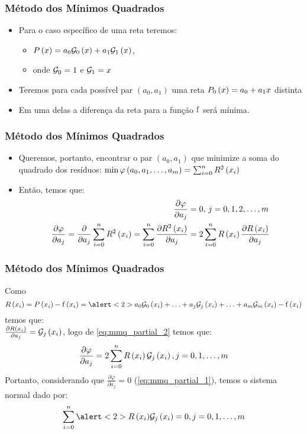 \begin{frame}
\frametitle{Método dos Mínimos Quadrados}

\begin{itemize}
  \item Para o caso específico de uma reta teremos:
    \begin{itemize}
      \item $P\left(x\right) = a_0 \mathcal{G}_0 \left(x\right) + a_1 \mathcal{G}_1 \left(x\right)$,
      \item onde $\mathcal{G}_0 = 1$ e $\mathcal{G}_1 = x$
    \end{itemize}
  \item Teremos para cada possível par $\left(a_0, a_1\right)$ uma reta $P_0 \left(x\right) = a_0 + a_1 x$ distinta
  \item Em uma delas a diferença da reta para a função $\mathrm{f}$ será mínima.
\end{itemize}
\end{frame}

\begin{frame}
\frametitle{Método dos Mínimos Quadrados}

\begin{itemize}
  \item Queremos, portanto, encontrar o par $\left(a_0, a_1\right)$ que minimize a soma do quadrado dos resíduos: $\min \varphi\left(a_0,a_1,\ldots,a_m\right) = \sum_{i=0}^{n}R^2\left(x_i\right)$
  \item Então, temos que:
\begin{align}
\frac{\partial \varphi}{\partial a_j} &= 0,\, j = 0,1,2,\ldots,m\label{eq:mmq_partial_1}\\
%
\frac{\partial \varphi}{\partial a_j} = %
\frac{\partial}{\partial a_j} \sum_{i=0}^{n} R^2 \left(\x_i\right) = %
\sum_{i=0}^{n} \frac{\partial R^2 \left(\x_i\right)}{\partial a_j} &= %
2 \sum_{i=0}^{n} R\left(\x_i\right) \frac{\partial R \left(\x_i\right)}{\partial a_j}\label{eq:mmq_partial_2}
\end{align}
%
\end{itemize}
\end{frame}

\begin{frame}
\frametitle{Método dos Mínimos Quadrados}

Como
{
\footnotesize
\begin{equation}
\label{eq:mmq_partial_3}
R\left(x_i\right) = P\left(x_i\right) - \f\left(x_i\right) =%
\alert<2>{a_0 \G_0 \left(\x_i\right) + \ldots + a_j \G_j \left(x_i\right) + \ldots + a_m \G_m \left(x_i\right) - \f \left(\x_i\right)}
\end{equation}}%
temos que:\\
$\frac{\partial R \left(x_i\right)}{\partial a_j} = \mathcal{G}_j \left(x_i\right)$, logo de \cref{eq:mmq_partial_2} temos que:
\[
\frac{\partial \varphi}{\partial a_j} = 2 \sum_{i=0}^{n} R\left(x_i\right) \mathcal{G}_j \left(x_i\right), j = 0,1,\ldots,m
\]
Portanto, considerando que $\frac{\partial \varphi}{\partial a_j} = 0$ (\cref{eq:mmq_partial_1}), temos o sistema normal dado por:
\[
\sum_{i=0}^{n} \alert<2>{R\left(\x_i\right)} \G_j \left(\x_i\right) = 0, j = 0, 1, \ldots, m
\]
\end{frame}

